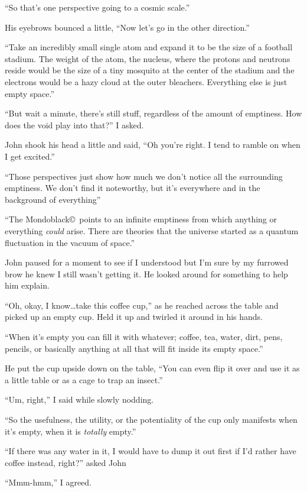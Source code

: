 ``So that's one perspective going to a cosmic scale.''

His eyebrows bounced a little, ``Now let's go in the other
direction.''

``Take an incredibly small single atom and expand it to be the
size of a football stadium. The weight of the atom, the nucleus,
where the protons and neutrons reside would be the size of a
tiny mosquito at the center of the stadium and the electrons
would be a hazy cloud at the outer bleachers. Everything
else is just empty space.''

``But wait a minute, there's still stuff, regardless
of the amount of emptiness. How does the void play
into that?'' I asked.

John shook his head a little and said, ``Oh you're right. I tend
to ramble on when I get excited.''

``Those perspectives just show how much we don't notice all the
surrounding emptiness. We don't find it noteworthy, but it's
everywhere and in the background of everything''

``The Mondoblack\copyright\ points to an infinite emptiness
from which anything or everything \emph{could} arise. There are
theories that the universe started as a quantum fluctuation in
the vacuum of space.''

John paused for a moment to see if I understood but I'm sure by
my furrowed brow he knew I still wasn't getting it. He looked
around for something to help him explain.

``Oh, okay, I know\ldots take this coffee cup,'' as he reached
across the table and picked up an empty cup. Held it up
and twirled it around in his hands.

``When it's empty you can fill it with whatever; coffee, tea,
water, dirt, pens, pencils, or basically anything at all that
will fit inside its empty space.''

He put the cup upside down on the table, ``You can even
flip it over and use it as a little table or as a cage
to trap an insect.''

``Um, right,'' I said while slowly nodding.

``So the usefulness, the utility, or the potentiality of
the cup only manifests when it's empty, when it is
\emph{totally} empty.''

``If there was any water in it, I would have to dump it out first if I'd rather
have coffee instead, right?'' asked John

``Mmm-hmm,'' I agreed.

